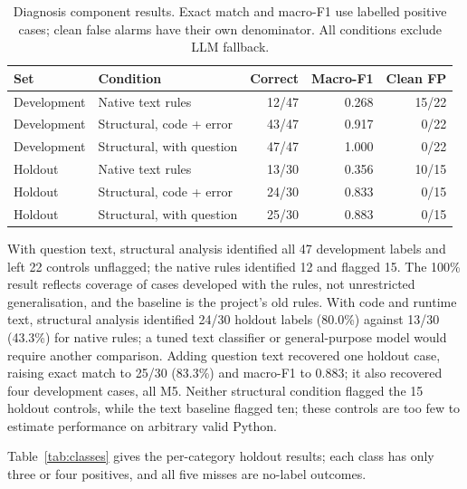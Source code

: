 \begin{table}[htbp]
\centering\footnotesize
\caption{Diagnosis component results. Exact match and macro-F1 use labelled positive cases; clean false alarms have their own denominator. All conditions exclude LLM fallback.}
\label{tab:diagnosis}
\begin{tabularx}{\textwidth}{p{24mm}Yrrr}
\toprule
Set & Condition & Correct & Macro-F1 & Clean FP\\
\midrule
Development & Native text rules & 12/47 & 0.268 & 15/22\\
Development & Structural, code + error & 43/47 & 0.917 & 0/22\\
Development & Structural, with question & 47/47 & 1.000 & 0/22\\
\midrule
Holdout & Native text rules & 13/30 & 0.356 & 10/15\\
Holdout & Structural, code + error & 24/30 & 0.833 & 0/15\\
Holdout & Structural, with question & 25/30 & 0.883 & 0/15\\
\bottomrule
\end{tabularx}
\end{table}

With question text, structural analysis identified all 47 development labels and left 22 controls unflagged; the native rules identified 12 and flagged 15. The 100\% result reflects coverage of cases developed with the rules, not unrestricted generalisation, and the baseline is the project's old rules. With code and runtime text, structural analysis identified 24/30 holdout labels (80.0\%) against 13/30 (43.3\%) for native rules; a tuned text classifier or general-purpose model would require another comparison. Adding question text recovered one holdout case, raising exact match to 25/30 (83.3\%) and macro-F1 to 0.883; it also recovered four development cases, all M5. Neither structural condition flagged the 15 holdout controls, while the text baseline flagged ten; these controls are too few to estimate performance on arbitrary valid Python.

Table~\ref{tab:classes} gives the per-category holdout results; each class has only three or four positives, and all five misses are no-label outcomes.


